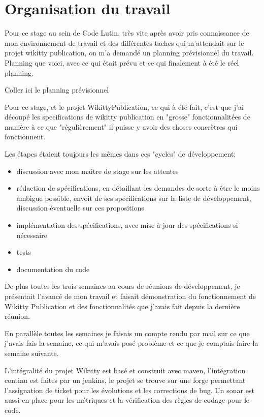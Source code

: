 \section{Organisation du travail}

Pour ce stage au sein de Code Lutin, très vite après avoir pris connaissance 
de mon environnement de travail et des différentes taches qui m'attendait sur
le projet wikitty publication, on m'a demandé un planning prévisionnel du travail.
Planning que voici, avec ce qui était prévu et ce qui finalement à été le réel
planning.

Coller ici le planning prévisionnel

Pour ce stage, et le projet WikittyPublication, ce qui à été fait, c'est que 
j'ai découpé les specifications de wikitty publication en "grosse" fonctionnalitées
de manière à ce que "régulièrement" il puisse y avoir des choses concrètres qui 
fonctionnent.

Les étapes étaient toujours les mêmes dans ces "cycles" de développement:
\begin{itemize}
\item discussion avec mon maitre de stage sur les attentes
\item rédaction de spécifications, en détaillant les demandes de sorte à être
le moins ambigue possible, envoit de ses spécifications sur la liste de 
développement, discussion éventuelle sur ces propositions
\item implémentation des spécifications, avec mise à jour des spécifications 
si nécessaire
\item tests
\item documentation du code
\end{itemize}

De plus toutes les trois semaines au cours de réunions de développement, je 
présentait l'avancé de mon travail et faisait démonstration du fonctionnement
de Wikitty Publication et des fonctionnalités que j'avais fait depuis la dernière
réunion.

En parallèle toutes les semaines je faisais un compte rendu par mail sur ce que 
j'avais fais la semaine, ce qui m'avais posé problème et ce que je comptais faire
la semaine suivante. 

L'intégralité du projet Wikitty est basé et construit avec maven, l'intégration
continu est faites par un jenkins, le projet se trouve sur une forge permettant
l'assignation de ticket pour les évolutions et les corrections de bug. 
Un sonar est aussi en place pour les métriques et la vérification des règles
de codage pour le code.




